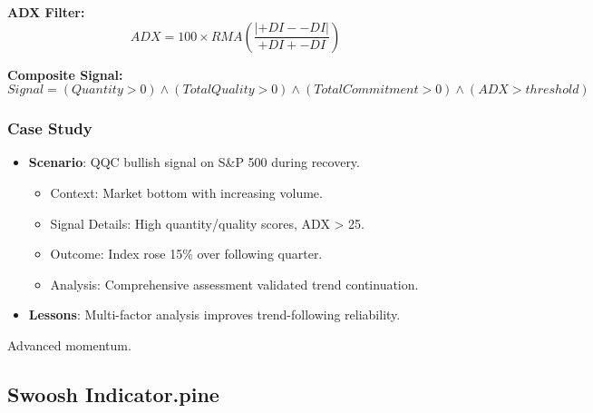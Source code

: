 \documentclass[12pt]{article}
\begin{document}
\textbf{ADX Filter:}
\[
ADX = 100 \times RMA\left( \frac{|+DI - -DI|}{+DI + -DI} \right)
\]

\textbf{Composite Signal:}
\[
Signal = (Quantity > 0) \land (TotalQuality > 0) \land (TotalCommitment > 0) \land (ADX > threshold)
\]

\subsubsection{Case Study}
\begin{itemize}
\item \textbf{Scenario}: QQC bullish signal on S\&P 500 during recovery.
  \begin{itemize}
  \item Context: Market bottom with increasing volume.
  \item Signal Details: High quantity/quality scores, ADX > 25.
  \item Outcome: Index rose 15\% over following quarter.
  \item Analysis: Comprehensive assessment validated trend continuation.
  \end{itemize}
\item \textbf{Lessons}: Multi-factor analysis improves trend-following reliability.
\end{itemize}
Advanced momentum.

\subsection{Swoosh Indicator.pine}
\label{subsec:swoosh}
\end{document}
